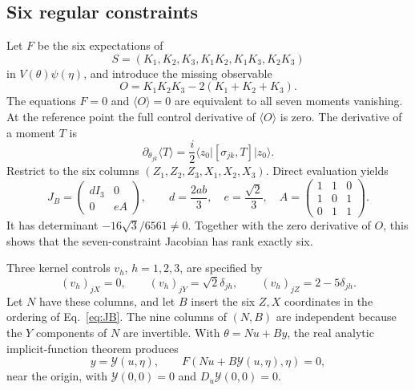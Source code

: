 \documentclass[11pt]{article}
\newcommand{\ket}[1]{\lvert #1\rangle}
\newcommand{\bra}[1]{\langle #1\rvert}
\newcommand{\av}[1]{\langle #1\rangle}
\begin{document}
\subsection{Six regular constraints}
Let $F$ be the six expectations of
\begin{equation}
S=(K_1,K_2,K_3,K_1K_2,K_1K_3,K_2K_3)
\end{equation}
in $V(\theta)\psi(\eta)$, and introduce the missing observable
\begin{equation}
O=K_1K_2K_3-2(K_1+K_2+K_3).
\label{eq:O}
\end{equation}
The equations $F=0$ and $\av O=0$ are equivalent to all seven moments vanishing. At the reference point the full control derivative of $\av O$ is zero. The derivative of a moment $T$ is
\begin{equation}
\partial_{\theta_{jk}}\av T=\frac i2\bra{z_0}[\sigma_{jk},T]\ket{z_0}.
\label{eq:derivative}
\end{equation}
Restrict to the six columns $(Z_1,Z_2,Z_3,X_1,X_2,X_3)$. Direct evaluation yields
\begin{equation}
J_B=\begin{pmatrix}d I_3&0\\0&e A\end{pmatrix},\qquad
d=\frac{2ab}{3},\quad e=\frac{\sqrt2}{3},\quad
A=\begin{pmatrix}1&1&0\\1&0&1\\0&1&1\end{pmatrix}.
\label{eq:JB}
\end{equation}
It has determinant $-16\sqrt3/6561\ne0$. Together with the zero derivative of $O$, this shows that the seven-constraint Jacobian has rank exactly six.

Three kernel controls $v_h$, $h=1,2,3$, are specified by
\begin{equation}
(v_h)_{jX}=0,\qquad (v_h)_{jY}=\sqrt2\delta_{jh},\qquad
(v_h)_{jZ}=2-5\delta_{jh}.
\end{equation}
Let $N$ have these columns, and let $B$ insert the six $Z,X$ coordinates in the ordering of Eq.~\eqref{eq:JB}. The nine columns of $(N,B)$ are independent because the $Y$ components of $N$ are invertible. With $\theta=Nu+By$, the real analytic implicit-function theorem produces
\begin{equation}
y=\mathcal Y(u,\eta),\qquad F(Nu+B\mathcal Y(u,\eta),\eta)=0,
\end{equation}
near the origin, with $\mathcal Y(0,0)=0$ and $D_u\mathcal Y(0,0)=0$.
\end{document}
